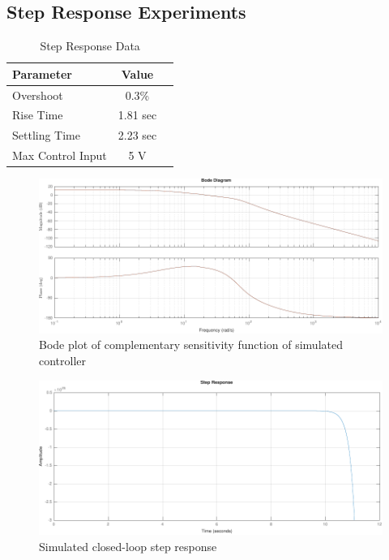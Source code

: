 \documentclass[11pt]{article}
\begin{document}
\subsection{Step Response Experiments}
\begin{table}[h!]
    \centering
    \begin{tabular}{@{}lcc@{}}
    \toprule
    \textbf{Parameter} & \textbf{Value} \\
    \midrule
    Overshoot & 0.3\% \\
    Rise Time & 1.81 sec \\
    Settling Time & 2.23 sec \\
    Max Control Input &  5 V\\
    \bottomrule
    \end{tabular}
    \caption{Step Response Data}
    \label{tab:step_response}
\end{table}
    
\begin{figure}[!ht]
\centering
\includegraphics[width=\textwidth]{bodecompsense.pdf}
\caption{Bode plot of complementary sensitivity function of simulated controller}
\label{fig:bodecompsense}
\end{figure}

\begin{figure}[!ht]
\centering
\includegraphics[width=\textwidth]{bodecompsenseStep.pdf}
\caption{Simulated closed-loop step response}
\label{fig:bodecompsenseStep}
\end{figure}
\end{document}
